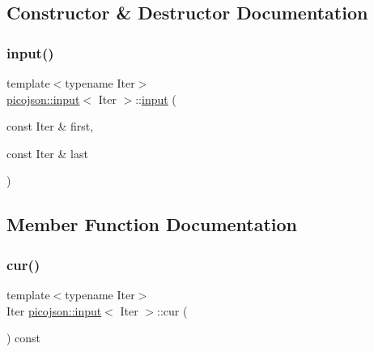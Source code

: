 \subsection{Constructor \& Destructor Documentation}
\hypertarget{classpicojson_1_1input_ab1ca217622d921118707de9e9011a62f}{}\label{classpicojson_1_1input_ab1ca217622d921118707de9e9011a62f} 
\subsubsection{\texorpdfstring{input()}{input()}}
{\footnotesize\ttfamily template$<$typename Iter$>$ \\
\hyperlink{classpicojson_1_1input}{picojson\+::input}$<$ Iter $>$\+::\hyperlink{classpicojson_1_1input}{input} (\begin{DoxyParamCaption}\item[{const Iter \&}]{first,  }\item[{const Iter \&}]{last }\end{DoxyParamCaption})\hspace{0.3cm}{\ttfamily [inline]}}



\subsection{Member Function Documentation}
\hypertarget{classpicojson_1_1input_ab2933aa5b68e73877fd331b925f4bf40}{}\label{classpicojson_1_1input_ab2933aa5b68e73877fd331b925f4bf40} 
\subsubsection{\texorpdfstring{cur()}{cur()}}
{\footnotesize\ttfamily template$<$typename Iter$>$ \\
Iter \hyperlink{classpicojson_1_1input}{picojson\+::input}$<$ Iter $>$\+::cur (\begin{DoxyParamCaption}{ }\end{DoxyParamCaption}) const\hspace{0.3cm}{\ttfamily [inline]}}

\hypertarget{classpicojson_1_1input_a14c29e99d9c9aa8cdbb46178c434d663}{}\label{classpicojson_1_1input_a14c29e99d9c9aa8cdbb46178c434d663} 
